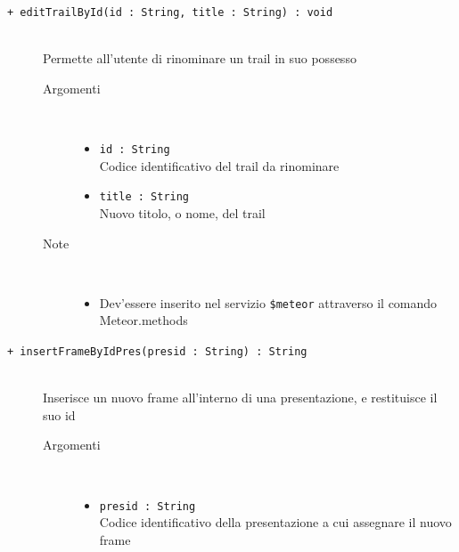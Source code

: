 \begin{description}
	\begin{description}
		\item[\texttt{+ editTrailById(id : String, title : String) : void			}] \hfill \\
			Permette all'utente di rinominare un trail in suo possesso
			
		\begin{description}
			\item[Argomenti] \hfill \\
				\begin{itemize}
				
					\item \texttt{id : String		} \hfill \\
					Codice identificativo del trail da rinominare
					\item \texttt{title : String		} \hfill \\
					Nuovo titolo, o nome, del trail
					
				\end{itemize}
			\item[Note] \hfill \\
			\begin{itemize}
					\item Dev'essere inserito nel servizio \texttt{\$meteor} attraverso il comando Meteor.methods
				\end{itemize}
		\end{description}
	\end{description}
	
	\begin{description}
		\item[\texttt{+ insertFrameByIdPres(presid : String) : String			}] \hfill \\
			Inserisce un nuovo frame all'interno di una presentazione, e restituisce il suo id
			
		\begin{description}
			\item[Argomenti] \hfill \\
				\begin{itemize}
				
					\item \texttt{presid : String			} \hfill \\
					Codice identificativo della presentazione a cui assegnare il nuovo frame
					

\end{itemize}
\end{description}
\end{description}
\end{description}
